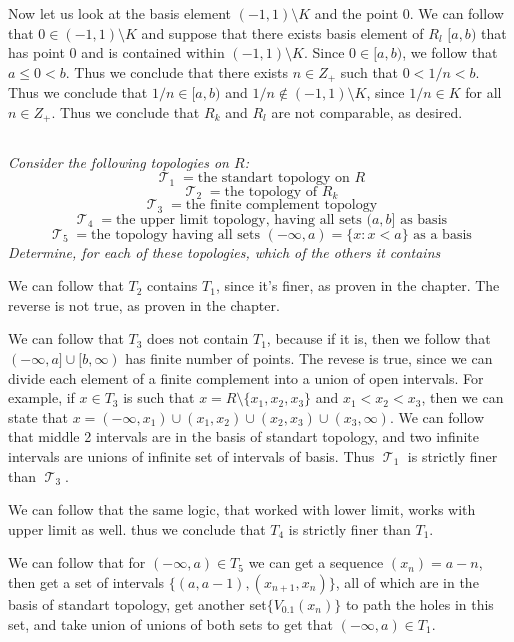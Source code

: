 \documentclass[11pt,oneside,titlepage]{book}
\DeclareMathOperator \topol {\mathcal {T}}
\newcommand{\set}[1]{\{ #1 \}}
\begin{document}
Now let us look at the basis element $(-1, 1) \setminus K$ and the point $0$. We can
follow that $0 \in (-1, 1) \setminus K$ and suppose that there exists basis element of
$R_l$  $[a, b)$ that has point $0$ and is contained within $(-1, 1) \setminus K$.
Since $0 \in [a, b)$, we follow that $a \leq 0 < b$. Thus we conclude that there exists
$n \in Z_+$ such that $0 < 1/n < b$. Thus we conclude that $1/n \in [a, b)$ and
$1/n \notin (-1, 1) \setminus K$, since $1/n \in K$ for all $n \in Z_+$. Thus we
conclude that $R_k$ and $R_l$ are not comparable, as desired.

\subsection{}

\textit{Consider the following topologies on $R$:
  $$\topol_1 = \text{the standart topology on $R$}$$
  $$\topol_2 = \text{the topology of $R_k$}$$
  $$\topol_3 = \text{the finite complement topology}$$
  $$\topol_4 = \text{the upper limit topology, having all sets $(a, b]$ as basis}$$
  $$\topol_5 = \text{the topology having all sets
    $(-\infty, a) = \set{x: x < a}$ as a basis}$$
    Determine, for each of these topologies, which of the others it contains
}

We can follow that $T_2$ contains $T_1$, since it's finer, as proven in the chapter. The
reverse is not true, as proven in the chapter.

We can follow that $T_3$ does not contain $T_1$, because if it is, then we follow that
$(-\infty, a] \cup [b, \infty)$ has finite number of points. The revese is true, since
we can divide each element of a finite complement into a union of
open intervals. For example, if $x \in T_3$ is such that $x = R \setminus \set{x_1, x_2, x_3}$
and $x_1 < x_2 < x_3$,
then we can state that $x = (-\infty, x_1) \cup (x_1, x_2) \cup (x_2, x_3) \cup (x_3, \infty)$.
We can follow that middle 2 intervals are in the basis of standart topology, and two infinite
intervals are unions of infinite set of intervals of basis.
Thus $\topol_1$ is strictly finer than $\topol_3$.

We can follow that the same logic, that worked with lower limit, works with upper limit as well.
thus we conclude that $T_4$ is strictly finer than $T_1$.

We can follow that for $(-\infty, a) \in T_5$ we can get a sequence $(x_n) = a - n$, then
get a set of intervals $\set{(a, a - 1), (x_{n + 1}, x_n)}$, all of which are in the basis of
standart topology, get another set$\set{V_{0.1}(x_n)}$ to path the holes in this set,
and take union of unions of both sets to get that $(-\infty, a) \in T_1$.
\end{document}
